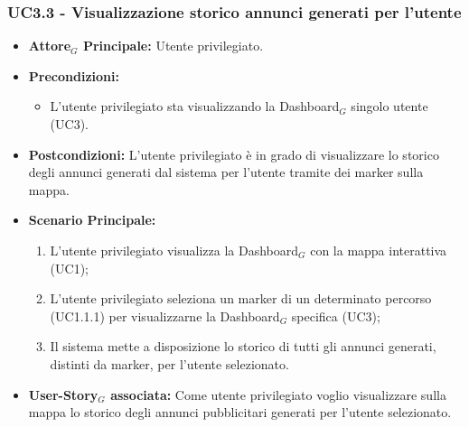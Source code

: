 \documentclass[11pt]{article}
\begin{document}
\begin{justify}
\subsubsection{\textbf{UC3.3 - Visualizzazione storico annunci generati per l'utente}}
\label{UC3.3}
\begin{itemize}
    \item \textbf{Attore$_G$ Principale:} Utente privilegiato.
    \item \textbf{Precondizioni:} 
        \begin{itemize}
    		\item L'utente privilegiato sta visualizzando la Dashboard$_G$ singolo utente (UC3).
        \end{itemize}
     \item \textbf{Postcondizioni:} L'utente privilegiato è in grado di visualizzare lo storico degli annunci generati dal sistema per l'utente tramite dei marker sulla mappa.
    \item \textbf{Scenario Principale:} 
      \begin{enumerate}
            \item L'utente privilegiato visualizza la Dashboard$_G$ con la mappa interattiva (UC1);
            \item L'utente privilegiato seleziona un marker di un determinato percorso (UC1.1.1) per visualizzarne la Dashboard$_G$ specifica (UC3);
            \item Il sistema mette a disposizione lo storico di tutti gli annunci generati, distinti da marker, per l'utente selezionato.
	\end{enumerate}
    \item \textbf{User-Story$_G$ associata:} Come utente privilegiato voglio visualizzare sulla mappa lo storico degli annunci pubblicitari generati per l'utente selezionato.
\end{itemize}

\end{justify}
\end{document}
